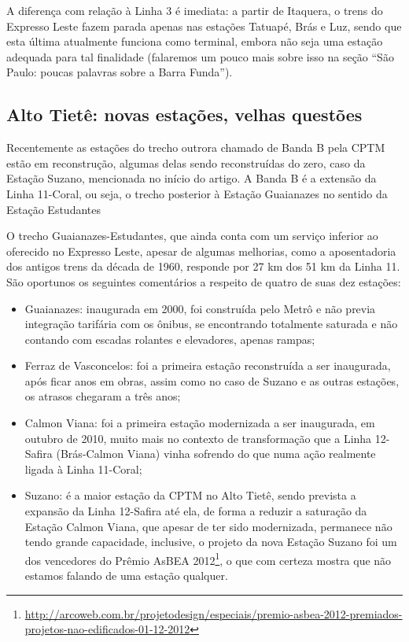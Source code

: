 \documentclass[11pt,fleqn]{book} %
\begin{document}
A diferença com relação à Linha 3 é imediata: a partir de Itaquera, o trens do Expresso Leste fazem parada apenas nas estações Tatuapé, Brás e Luz, sendo que esta última atualmente funciona como terminal, embora não seja uma estação adequada para tal finalidade (falaremos um pouco mais sobre isso na seção “São Paulo: poucas palavras sobre a Barra Funda”).

\subsection{Alto Tietê: novas estações, velhas questões}

Recentemente as estações do trecho outrora chamado de Banda B pela CPTM estão em reconstrução, algumas delas sendo reconstruídas do zero, caso da Estação Suzano, mencionada no início do artigo. A Banda B é a extensão da Linha 11-Coral, ou seja, o trecho posterior à Estação Guaianazes no sentido da Estação Estudantes


O trecho Guaianazes-Estudantes, que ainda conta com um serviço inferior ao oferecido no Expresso Leste, apesar de algumas melhorias, como a aposentadoria dos antigos trens da década de 1960, responde por 27 km dos 51 km da Linha 11. São oportunos os seguintes comentários a respeito de quatro de suas dez estações:

\begin{itemize}
	\item Guaianazes: inaugurada em 2000, foi construída pelo Metrô e não previa integração tarifária com os ônibus, se encontrando totalmente saturada e não contando com escadas rolantes e elevadores, apenas rampas;
	\item Ferraz de Vasconcelos: foi a primeira estação reconstruída a ser inaugurada, após ficar anos em obras, assim como no caso de Suzano e as outras estações, os atrasos chegaram a três anos;
	\item Calmon Viana: foi a primeira estação modernizada a ser inaugurada, em outubro de 2010, muito mais no contexto de transformação que a Linha 12-Safira (Brás-Calmon Viana) vinha sofrendo do que numa ação realmente ligada à Linha 11-Coral;
	\item Suzano: é a maior estação da CPTM no Alto Tietê, sendo prevista a expansão da Linha 12-Safira até ela, de forma a reduzir a saturação da Estação Calmon Viana, que apesar de ter sido modernizada, permanece não tendo grande capacidade, inclusive, o projeto da nova Estação Suzano foi um dos vencedores do Prêmio AsBEA 2012\footnote{\url{http://arcoweb.com.br/projetodesign/especiais/premio-asbea-2012-premiados-projetos-nao-edificados-01-12-2012}}, o que com certeza mostra que não estamos falando de uma estação qualquer.
\end{itemize}
\end{document}
